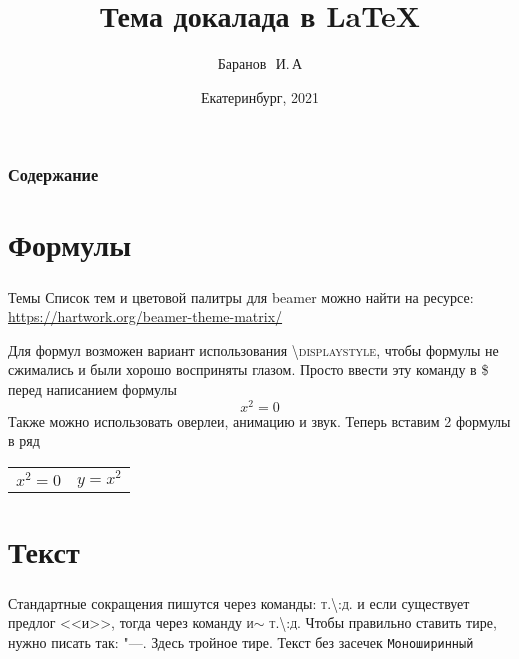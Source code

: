 \documentclass[russian]{beamer}
\title{Тема докалада в \LaTeX}
\author{Баранов~\,И.\,А}
\institute{Уральский Федеральный Университет}
\date{Екатеринбург, 2021}
\begin{document}
\begin{frame}
	\maketitle
	\setcounter{framenumber}{0}
\end{frame}

\begin{frame}
	\frametitle{Содержание}
	\tableofcontents
\end{frame}

\section{Формулы}
\begin{frame}
\frametitle{\insertsection}
\begin{block}{Темы}
Список тем и цветовой палитры для beamer можно найти на ресурсе:\newline
\href{https://hartwork.org/beamer-theme-matrix/}{https://hartwork.org/beamer-theme-matrix/}
\end{block}
Для формул возможен вариант использования \textsc{\textbackslash displaystyle}, чтобы формулы не сжимались и были хорошо восприняты глазом.\newline
Просто ввести эту команду в \textsc{\$} перед написанием формулы
$$
	x^2=0
$$
Также можно использовать оверлеи, анимацию и звук.\newline
Теперь вставим 2 формулы в ряд\newline
\begin{center}
\begin{tabular}{cc}
$x^2=0$ & $y=x^2$
\end{tabular}
\end{center}
\end{frame}

\section{Текст}
\begin{frame}
	\frametitle{\insertsection}
	Стандартные сокращения пишутся через команды: \textsc{т.\textbackslash:д.} и если существует предлог <<и>>, тогда через команду \textsc{и$\sim$ т.\textbackslash:д.}\newline
Чтобы правильно ставить тире, нужно писать так: \textsc{"---}. Здесь тройное тире.\newline
\textsf{Текст без засечек}\newline
\texttt{Моноширинный}\newline
{}\newline
{}
\end{frame}
\end{document}
